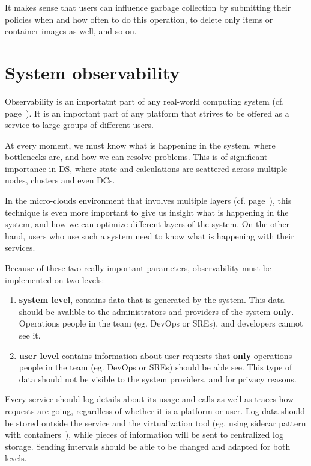 It makes sense that users can influence garbage collection by submitting their policies when and how often to do this operation, to delete only items or container images as well, and so on.
%
%
\section{System observability}\label{sec:system_observability}
%
Observability is an importatnt part of any real-world computing system (cf. page~\pageref{sec:log_aggregation}). It is an important part of any platform that strives to be offered as a service to large groups of different users. 

At every moment, we must know what is happening in the system, where bottlenecks are, and how we can resolve problems. This is of significant importance in DS, where state and calculations are scattered across multiple nodes, clusters and even DCs.

In the micro-clouds environment that involves multiple layers (cf. page~\pageref{lab:three-tier}), this technique is even more important to give us insight what is happening in the system, and how we can optimize different layers of the system. On the other hand, users who use such a system need to know what is happening with their services.

Because of these two really important parameters, observability must be implemented on two levels:

\begin{enumerate}[start=1,label={(\bfseries \arabic*)}]
	\item \textbf{system level}, contains data that is generated by the system. This data should be avalible to the administrators and providers of the system \textbf{only}. Operations people in the team (eg. DevOps or SREs), and developers cannot see it.
	\item \textbf{user level} contains information about user requests that \textbf{only} operations people in the team (eg. DevOps or SREs) should be able see. This type of data should not be visible to the system providers, and for privacy reasons.
\end{enumerate}

\noindent
Every service should log details about its usage and calls as well as traces how requests are going, regardless of whether it is a platform or user. Log data should be stored outside the service and the virtualization tool (eg. using sidecar pattern with containers~\cite{BurnsO16}), while pieces of information will be sent to centralized log storage. Sending intervals should be able to be changed and adapted for both levels.

